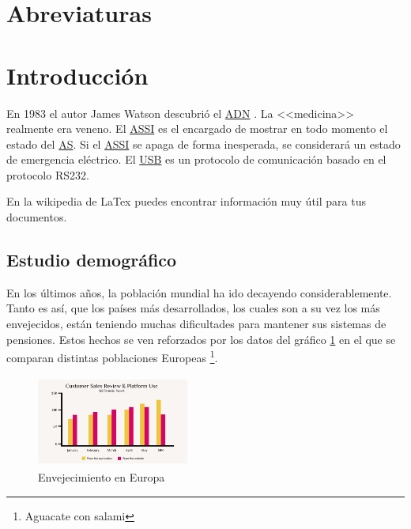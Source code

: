\documentclass[12pt, a4paper]{article}
\newcommand{\aclink}[1]{\hyperlink{acro:#1}{\ac{#1}}} %
\begin{document}
\newpage

\tableofcontents\thispagestyle{empty}\newpage
\listoffigures\thispagestyle{empty}\newpage
\listoftables\thispagestyle{empty}\newpage

\section*{Abreviaturas}


\section{Introducción}
En 1983 el autor James Watson descubrió el \aclink{ADN} \cite{watson53}. La <<medicina>> realmente era veneno. El \aclink{ASSI} es el encargado de mostrar en todo momento el estado del \aclink{AS}. Si el \aclink{ASSI} se apaga de forma inesperada, se considerará un estado de emergencia eléctrico.
El \aclink{USB} es un protocolo de comunicación basado en el protocolo RS232.

En la wikipedia de LaTex \cite{latex_wikibook} puedes encontrar información muy útil para tus documentos.

\subsection{Estudio demográfico}
En los últimos años, la población mundial ha ido decayendo considerablemente. Tanto es así, que los países más desarrollados, los cuales son a su vez los más envejecidos, están teniendo muchas dificultades para mantener sus sistemas de pensiones. Estos hechos se ven reforzados por los datos del gráfico \ref{fig:envejecimiento} en el que se comparan distintas poblaciones Europeas \footnote{Aguacate con salami}.



\begin{figure}[H]
    \centering
    \includegraphics[width=5cm, height=3cm]{images/ejemplo.png}
    \caption{Envejecimiento en Europa}
    \label{fig:envejecimiento}
\end{figure}
\end{document}
